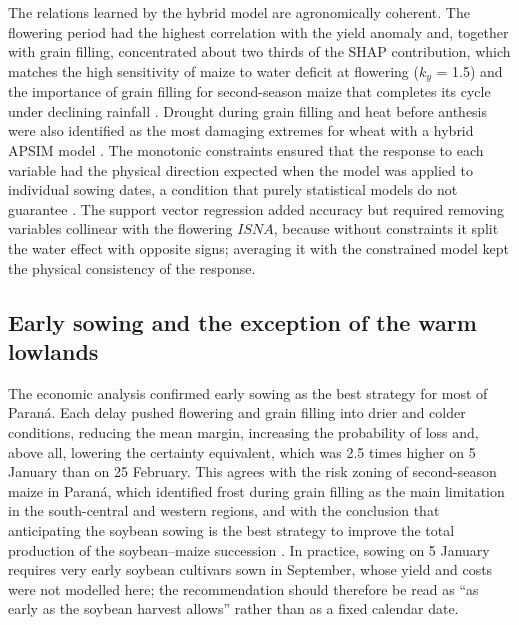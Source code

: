\documentclass[10pt,a4paper]{article}
\begin{document}
The relations learned by the hybrid model are agronomically coherent. The flowering period had the
highest correlation with the yield anomaly and, together with grain filling, concentrated about two thirds
of the SHAP contribution, which matches the high sensitivity of maize to water deficit at flowering
($k_y$ = 1.5) and the importance of grain filling for second-season maize that completes its cycle under
declining rainfall \citep{doorenbos1979, andrea2018}. Drought during grain filling and heat before anthesis
were also identified as the most damaging extremes for wheat with a hybrid APSIM model \citep{feng2019}.
The monotonic constraints ensured that the response to each variable had the physical direction expected
when the model was applied to individual sowing dates, a condition that purely statistical models do not
guarantee \citep{karpatne2017}. The support vector regression added accuracy but required removing
variables collinear with the flowering $ISNA$, because without constraints it split the water effect with
opposite signs; averaging it with the constrained model kept the physical consistency of the response.

\subsection{Early sowing and the exception of the warm lowlands}
\label{subsec:dis_sowing}

The economic analysis confirmed early sowing as the best strategy for most of Paraná. Each delay pushed
flowering and grain filling into drier and colder conditions, reducing the mean margin, increasing the
probability of loss and, above all, lowering the certainty equivalent, which was 2.5 times higher on
5 January than on 25 February. This agrees with the risk zoning of second-season maize in Paraná, which
identified frost during grain filling as the main limitation in the south-central and western regions,
and with the conclusion that anticipating the soybean sowing is the best strategy to improve the total
production of the soybean--maize succession \citep{goncalves2002, noia2019eja, noia2020}. In practice, sowing
on 5 January requires very early soybean cultivars sown in September, whose yield and costs were not
modelled here; the recommendation should therefore be read as ``as early as the soybean harvest allows''
rather than as a fixed calendar date.
\end{document}
